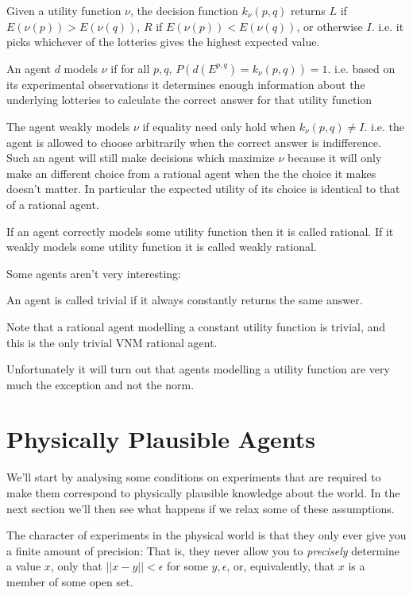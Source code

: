 \begin{definition}
Given a utility function $\nu$, the decision function $k_\nu(p, q)$ returns
$L$ if $E(\nu(p)) > E(\nu(q))$, $R$ if $E(\nu(p)) < E(\nu(q))$, or otherwise
$I$. i.e. it picks whichever of the lotteries gives the highest expected
value.

An agent $d$ models $\nu$ if 
for all $p, q$, $P(d(E^{p, q}) = k_\nu(p, q)) = 1$. i.e. based on its
experimental observations it determines enough information about the underlying
lotteries to calculate the correct answer for that utility function

The agent weakly models $\nu$ if equality need only hold when $k_\nu(p, q) \neq I$.
i.e. the agent is allowed to choose arbitrarily when the correct answer is
indifference. Such an agent will still make decisions which maximize $\nu$ because
it will only make an different choice from a rational agent when the the
choice it makes doesn't matter. In particular the expected utility of its choice
is identical to that of a rational agent.

If an agent correctly models some utility function then it is called rational.
If it weakly models some utility function it is called weakly rational.
\end{definition}

Some agents aren't very interesting:

\begin{definition}
An agent is called trivial if it always constantly returns the same answer.
\end{definition}

Note that a rational agent modelling a constant utility function is trivial,
and this is the only trivial VNM rational agent.

Unfortunately it will turn out that agents modelling a utility function
are very much the exception and not the norm.

\section{Physically Plausible Agents}

We'll start by analysing some conditions on experiments that are required
to make them correspond to physically plausible knowledge about the world.
In the next section we'll then see what happens if we relax some of these
assumptions.

The character of experiments in the physical world is that they only ever
give you a finite amount of precision: That is, they never allow you to
\textit{precisely} determine a value $x$,
only that $||x - y|| < \epsilon$
for some $y, \epsilon$,
or, equivalently, that $x$
is a member of some open set.


